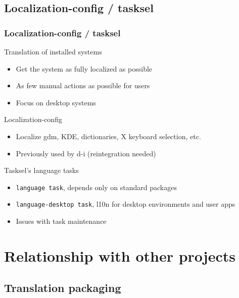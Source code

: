 \documentclass{beamer}
\begin{document}
\subsection{Localization-config / tasksel}

\begin{frame}
  \frametitle{Localization-config / tasksel}
	\begin{block}
		{Translation of installed systems}
		\begin{itemize}
		\item Get the system as fully localized as possible
		\item As few manual actions as possible for users 
		\item Focus on desktop systems
		\end{itemize}
	\end{block}
	\begin{block}
		{Localization-config}
		\begin{itemize}
		\item Localize gdm, KDE, dictionaries, X keyboard selection, etc.
		\item Previously used by d-i (reintegration needed)
		\end{itemize}
	\end{block}
	\begin{block}
		{Tasksel's language tasks}
		\begin{itemize}
		\item
			{\texttt{language task}}, depends only on standard packages
		\item
			{\texttt{language-desktop task}}, l10n for desktop environments and user apps
		\item
			{Issues with task maintenance}
		\end{itemize}
	\end{block}
\end{frame}

\section{Relationship with other projects}

\subsection{Translation packaging}
\end{document}
